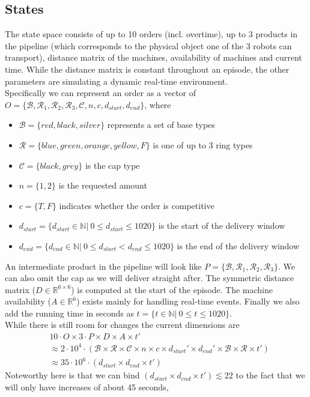 \documentclass[runningheads,envcountsect]{llncs}
\begin{document}
\subsection{States} \label{states}
The state space consists of up to 10 orders (incl. overtime), up to 3 products in the pipeline (which corresponds to the physical object one of the 3 robots can transport), distance matrix of the machines, availability of machines and current time. While the distance matrix is constant throughout an episode, the other parameters are simulating a dynamic real-time environment.\\
Specifically we can represent an order as a vector of $O=\{\mathcal{B}, \mathcal{R}_1, \mathcal{R}_2, \mathcal{R}_3, \mathcal{C}, n, c, d_{start}, d_{end}  \}$, where
\begin{itemize}
  \item $\mathcal{B}=\{red, black, silver\}$ represents a set of base types
  \item $\mathcal{R}=\{blue, green, orange, yellow, F\}$ is one of up to 3 ring types
  \item $\mathcal{C}=\{black, grey\}$ is the cap type
  \item $n = \{1,2\}$ is the requested amount
  \item $c = \{T, F\}$ indicates whether the order is competitive
  \item $d_{start} = \{d_{start} \in \mathbb{N}|\ 0 \leq d_{start} \leq 1020 \}$ is the start of the delivery window
  \item $d_{end} = \{d_{end} \in \mathbb{N}|\ 0 \leq d_{start} < d_{end} \leq 1020 \}$ is the end of the delivery window
\end{itemize}
An intermediate product in the pipeline will look like $P=\{\mathcal{B}, \mathcal{R}_1, \mathcal{R}_2, \mathcal{R}_3\}$. We can also omit the cap as we will deliver straight after.
The symmetric distance matrix ($D \in \mathbb{R}^{6 \times 6}$) is computed at the start of the episode. 
The machine availability ($A \in \mathbb{R}^6$) exists mainly for handling real-time events.
Finally we also add the running time in seconds as $t = \{t \in \mathbb{N}|\ 0 \leq t \leq 1020 \}$.\\
While there is still room for changes the current dimensions are
\begin{align*}
&10 \cdot O \times 
3 \cdot P \times 
D \times
A \times
t' \\
&\approx 2 \cdot 10^4 \cdot (
\mathcal{B} \times 
\mathcal{R} \times 
\mathcal{C} \times 
n \times 
c \times 
d_{start}' \times 
d_{end}' \times 
\mathcal{B} \times
\mathcal{R} \times 
t' )\\
&\approx 35 \cdot 10^6 \cdot (d_{start} \times d_{end} \times t')
\end{align*}
Noteworthy here is that we can bind $(d_{start} \times d_{end} \times t') \lesssim 22$ to the fact that we will only have increases of about 45 seconds, 
\end{document}

